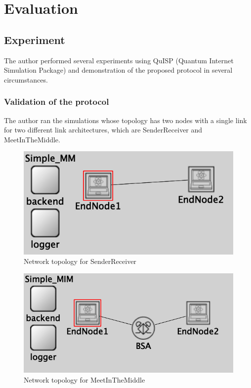 \chapter{Evaluation}
\label{evaluation}

\section{Experiment}

The author performed several experiments using QuISP (Quantum Internet Simulation Package) and demonstration of the proposed protocol in several circumstances.

\subsection{Validation of the protocol}
The author ran the simulations whose topology has two nodes with a single link for two different link architectures, which are SenderReceiver and MeetInTheMiddle.

\begin{figure}[H]
  \centerline{\includegraphics[width=.8\columnwidth]{images/topology_MM.png}}
  \caption{Network topology for SenderReceiver}
\end{figure}

\begin{figure}[H]
  \centerline{\includegraphics[width=.8\columnwidth]{images/topology_MIM.png}}
  \caption{Network topology for MeetInTheMiddle}
\end{figure}

